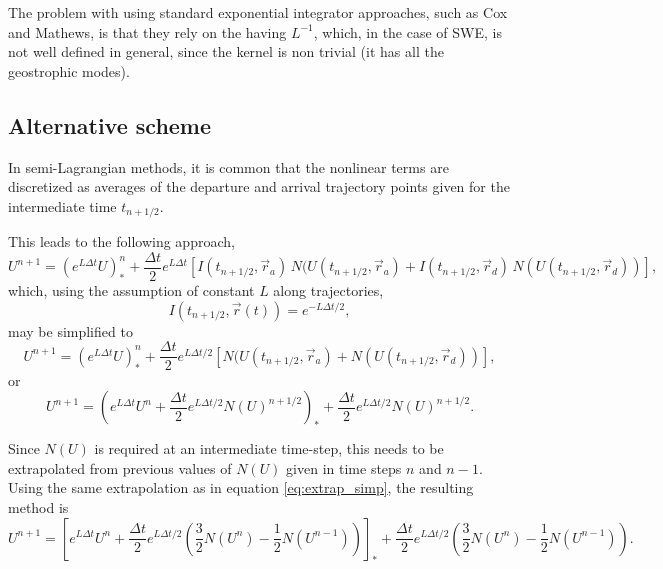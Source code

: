 \documentclass[10pt,a4paper]{article}
\begin{document}
The problem with using standard exponential integrator approaches, such as Cox and Mathews, is that they rely on the having $L^{-1}$, which, in the case of SWE, is not well defined in general, since the kernel is non trivial (it has all the geostrophic modes).


\subsection{Alternative scheme}

In semi-Lagrangian methods, it is common that the nonlinear terms are discretized as averages of the departure and arrival trajectory points given for the intermediate time $t_{n+1/2}$.


This leads to the following approach,
\begin{equation}
U^{n+1}=(e^{L \Delta t} U)^{n}_{*}+\frac{\Delta t}{2}e^{L\Delta t}\left[ I(t_{n+1/2}, \vec{r}_a)\, N(U(t_{n+1/2}, \vec{r}_a)+I(t_{n+1/2}, \vec{r}_d)\, N(U(t_{n+1/2}, \vec{r}_d))\right],
\end{equation}
which, using the assumption of constant $L$ along trajectories,
\begin{equation}
 I(t_{n+1/2}, \vec{r}(t))=e^{-L\Delta t/2},
\end{equation} 
may be simplified to
\begin{equation}
U^{n+1}=(e^{L \Delta t} U)^{n}_{*}+\frac{\Delta t}{2}e^{L\Delta t/2}\left[ N(U(t_{n+1/2}, \vec{r}_a)+ N(U(t_{n+1/2}, \vec{r}_d))\right],
\end{equation}
or
\begin{equation}
U^{n+1}=\left(e^{L \Delta t} U^n +\frac{\Delta t}{2}e^{L\Delta t/2}N(U)^{n+1/2}\right)_{*}+\frac{\Delta t}{2}e^{L\Delta t/2} N(U)^{n+1/2}.
\end{equation}

Since $N(U)$ is required at an intermediate time-step, this needs to be extrapolated from previous values of $N(U)$ given in time steps $n$ and $n-1$. Using the same extrapolation as in equation \eqref{eq:extrap_simp}, the resulting method is
\begin{equation}
U^{n+1}=\left[e^{L \Delta t} U^n +\frac{\Delta t}{2}e^{L\Delta t/2}\left(\frac{3}{2}N(U^n)-\frac{1}{2}N(U^{n-1})\right)\right]_{*}+\frac{\Delta t}{2}e^{L\Delta t/2} \left(\frac{3}{2}N(U^n)-\frac{1}{2}N(U^{n-1})\right).
\end{equation}
\end{document}
